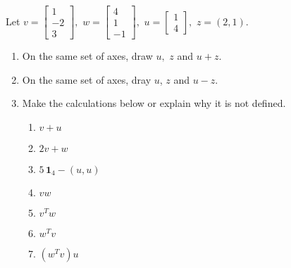\documentclass[11pt,fleqn]{article}
\newcommand{\bbm}{\begin{bmatrix}}
\newcommand{\ebm}{\end{bmatrix}}
\begin{document}
\renewcommand{\headrulewidth}{0pt}
\newcommand{\blank}[1]{\rule{#1}{0.75pt}}
\renewcommand{\d}{\displaystyle}
\vspace*{-0.7in}
\begin{center}
  \large {}
\end{center}

Let $\d v=\begin{bmatrix} 1 \\ -2 \\ 3 \end{bmatrix},$ $w=\bbm 4\\1\\-1 \ebm,$  $u=\bbm 1\\4 \ebm,$ $z=(2,1).$
\begin{enumerate}
\item On the same set of axes, draw $u,$ $z$ and $u+z$.
\vfill
\item On the same set of axes, dray $u$, $z$ and $u-z$.
\vfill
\item Make the calculations below or explain why it is not defined.\\
	\begin{multicols}{2}
	\begin{enumerate}
	\item $v+u$\\
	
	\vspace{.5in}
	
	\item $2v+w$\\
		
\vspace{.5in}
	
	\item $5 \, \textbf{1}_4 - (u,u)$\\
		\vspace{.5in}	
	\item $vw$\\ \vspace{.5in}

	
	\item $v^Tw$\\
		\vspace{.5in}

	
	\item $w^Tv$\\
		\vspace{.5in}

	
	\item $(w^Tv)u$\\
		\vspace{.5in}


\end{enumerate}
\end{multicols}
\end{enumerate}
\end{document}
